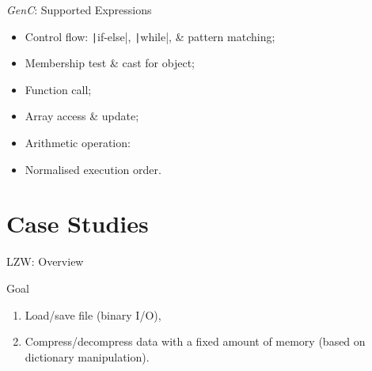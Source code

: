 \documentclass[xcolor={usenames,dvipsnames}]{beamer}
\newcommand{\GenC}{\emph{GenC}\xspace}
\newcommand{\InlineS}[1]{\texttt|#1|}
\begin{document}
\begin{frame}[fragile]{\GenC: Supported Expressions}
  \begin{itemize}
    \item Control flow: \InlineS{if-else}, \InlineS{while}, \& pattern matching;
    \item Membership test \& cast for object;
    \item Function call;
    \item Array access \& update;
    \item Arithmetic operation:
    \item \alert{Normalised} execution order.
  \end{itemize}
\end{frame}



\section{Case Studies}

\begin{frame}{LZW: Overview}

  \begin{block}{Goal}
    \begin{enumerate}
      \item Load/save file (binary I/O),
      \item Compress/decompress data with a fixed amount of memory (based on dictionary manipulation).
    \end{enumerate}
  \end{block}

\end{frame}
\end{document}
